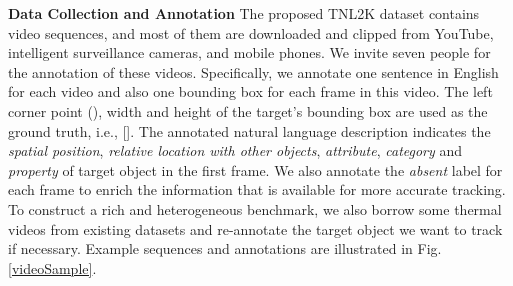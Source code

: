 \documentclass[final]{cvpr}
\begin{document}
\textbf{Data Collection and Annotation}
The proposed TNL2K dataset contains  video sequences, and most of them are downloaded and clipped from YouTube, intelligent surveillance cameras, and mobile phones. We invite seven people for the annotation of these videos. Specifically, we annotate one sentence in English for each video and also one bounding box for each frame in this video. The left corner point (), width  and height  of the target's bounding box are used as the ground truth, i.e., []. The annotated natural language description indicates the \emph{spatial position}, \emph{relative location with other objects}, \emph{attribute}, \emph{category} and \emph{property} of target object in the first frame. We also annotate the \emph{absent} label for each frame to enrich the information that is available for more accurate tracking. To construct a rich and heterogeneous benchmark, we also borrow some thermal videos from existing datasets \cite{li2019rgbt234, liu2019ptbtracking} and re-annotate the target object we want to track if necessary. Example sequences and annotations are illustrated in Fig. \ref{videoSample}. 
\end{document}
